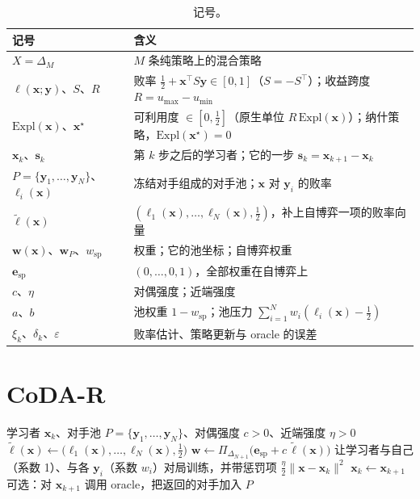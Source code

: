 \documentclass{article}
\theoremstyle{plain}
\theoremstyle{remark}
\newcommand{\Expl}{\mathrm{Expl}}
\newcommand{\Proj}{\Pi}
\newcommand{\simplex}{\Delta}
\newcommand{\bx}{{\bm{x}}}
\newcommand{\by}{{\bm{y}}}
\newcommand{\bw}{{\bm{w}}}
\newcommand{\be}{{\bm{e}}}
\newcommand{\bell}{{\bm{\ell}}}
\newcommand{\aug}{\tilde{\bell}}
\newcommand{\xs}{\bx^{\star}}
\newcommand{\dx}{{\bm{s}}}
\newcommand{\esp}{\be_{\mathrm{sp}}}
\newcommand{\wsp}{w_{\mathrm{sp}}}
\newcommand{\codar}{CoDA-R}
\begin{document}
\begin{table}[t]
\caption{记号。}
\label{tab:notation}
\begin{center}
\small
\begin{tabular}{ll}
\toprule
记号 & 含义 \\
\midrule
$X=\simplex_M$ & $M$ 条纯策略上的混合策略 \\
$\ell(\bx;\by)$、$S$、$R$ & 败率 $\tfrac12+\bx^\top S\by\in[0,1]$（$S=-S^\top$）；收益跨度 $R=u_{\max}-u_{\min}$ \\
$\Expl(\bx)$、$\xs$ & 可利用度 $\in[0,\tfrac12]$（原生单位 $R\,\Expl(\bx)$）；纳什策略，$\Expl(\xs)=0$ \\
$\bx_k$、$\dx_k$ & 第 $k$ 步之后的学习者；它的一步 $\dx_k=\bx_{k+1}-\bx_k$ \\
$P=\{\by_1,\dots,\by_N\}$、$\ell_i(\bx)$ & 冻结对手组成的对手池；$\bx$ 对 $\by_i$ 的败率 \\
$\aug(\bx)$ & $(\ell_1(\bx),\dots,\ell_N(\bx),\tfrac12)$，补上自博弈一项的败率向量 \\
$\bw(\bx)$、$\bw_P$、$\wsp$ & 权重；它的池坐标；自博弈权重 \\
$\esp$ & $(0,\dots,0,1)$，全部权重在自博弈上 \\
$c$、$\eta$ & 对偶强度；近端强度 \\
$a$、$b$ & 池权重 $1-\wsp$；池压力 $\sum_{i=1}^Nw_i(\ell_i(\bx)-\tfrac12)$ \\
$\xi_k$、$\delta_k$、$\varepsilon$ & 败率估计、策略更新与 oracle 的误差 \\
\bottomrule
\end{tabular}
\end{center}
\end{table}

\section{\codar{}}
\label{sec:alg}

\begin{algorithm}[t]
\caption{精确 \codar{} 的一步。}
\label{alg:codar}
\begin{algorithmic}[1]
\Require 学习者 $\bx_k$、对手池 $P=\{\by_1,\dots,\by_N\}$、对偶强度 $c>0$、近端强度 $\eta>0$
\State $\aug(\bx)\leftarrow\big(\ell_1(\bx),\dots,\ell_N(\bx),\tfrac12\big)$ 
\State $\bw\leftarrow\Proj_{\simplex_{N+1}}\big(\esp+c\,\aug(\bx)\big)$ 
\State 让学习者与自己（系数 1）、与各 $\by_i$（系数 $w_i$）对局训练，并带惩罚项 $\tfrac\eta2\|\bx-\bx_k\|^2$ 
\State $\bx_k\leftarrow\bx_{k+1}$ 
\State 可选：对 $\bx_{k+1}$ 调用 oracle，把返回的对手加入 $P$
\end{algorithmic}
\end{algorithm}
\end{document}
